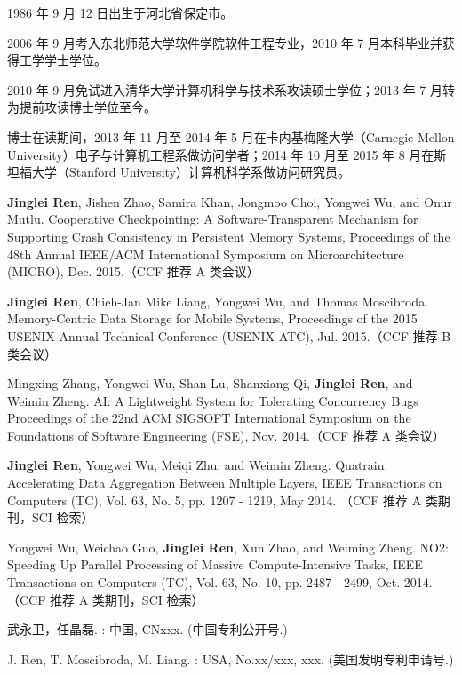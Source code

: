 \begin{resume}


  1986 年 9 月 12 日出生于河北省保定市。

  2006 年 9 月考入东北师范大学软件学院软件工程专业，2010 年 7 月本科毕业并获得工学学士学位。

  2010 年 9 月免试进入清华大学计算机科学与技术系攻读硕士学位；2013 年 7 月转为提前攻读博士学位至今。

  博士在读期间，2013 年 11 月至 2014 年 5 月在卡内基梅隆大学（Carnegie Mellon University）电子与计算机工程系做访问学者；2014 年 10 月至 2015 年 8 月在斯坦福大学（Stanford University）计算机科学系做访问研究员。

  \begin{publications}
  \item \textbf{Jinglei Ren}, Jishen Zhao, Samira Khan, Jongmoo Choi, Yongwei Wu, and Onur Mutlu.
Cooperative Checkpointing: A Software-Transparent Mechanism for Supporting Crash Consistency in Persistent Memory Systems, 
Proceedings of the 48th Annual IEEE/ACM International Symposium on Microarchitecture (MICRO), Dec. 2015.（CCF 推荐 A 类会议）
  \item \textbf{Jinglei Ren}, Chieh-Jan Mike Liang, Yongwei Wu, and Thomas Moscibroda.
Memory-Centric Data Storage for Mobile Systems, 
Proceedings of the 2015 USENIX Annual Technical Conference (USENIX ATC), Jul. 2015.（CCF 推荐 B 类会议）
  \item Mingxing Zhang, Yongwei Wu, Shan Lu, Shanxiang Qi, \textbf{Jinglei Ren}, and Weimin Zheng.
AI: A Lightweight System for Tolerating Concurrency Bugs 
Proceedings of the 22nd ACM SIGSOFT International Symposium on the Foundations of Software Engineering (FSE), Nov. 2014.（CCF 推荐 A 类会议）
  \item \textbf{Jinglei Ren}, Yongwei Wu, Meiqi Zhu, and Weimin Zheng.
Quatrain: Accelerating Data Aggregation Between Multiple Layers,
IEEE Transactions on Computers (TC), Vol. 63, No. 5, pp. 1207 - 1219, May 2014. （CCF 推荐 A 类期刊，SCI 检索）
  \item Yongwei Wu, Weichao Guo, \textbf{Jinglei Ren}, Xun Zhao, and Weiming Zheng.
NO2: Speeding Up Parallel Processing of Massive Compute-Intensive Tasks,
IEEE Transactions on Computers (TC), Vol. 63, No. 10, pp. 2487 - 2499, Oct. 2014.（CCF 推荐 A 类期刊，SCI 检索）
  \end{publications}

  \begin{achievements}
  \item 武永卫，任晶磊. : 中国, CNxxx. (中国专利公开号.)
  \item J. Ren, T. Moscibroda, M. Liang. : USA, No.xx/xxx, xxx. (美国发明专利申请号.)
  \end{achievements}
\end{resume}
